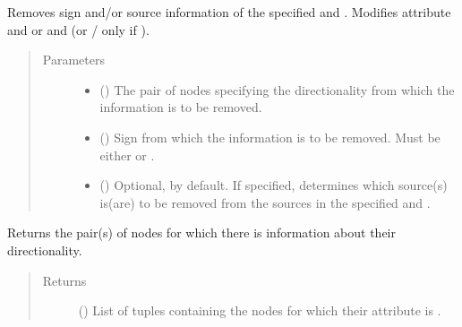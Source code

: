 \documentclass[letterpaper,10pt,english]{sphinxmanual}
\begin{document}
\begin{fulllineitems}
\begin{fulllineitems}
\label{\detokenize{main:pypath.main.Direction.unset_sign}}
Removes sign and/or source information of the specified
 and . Modifies attribute 
and  or  and
 (or
/
only if ).
\begin{quote}\begin{description}
\item[{Parameters}] \leavevmode\begin{itemize}
\item {} 
 () \textendash{} The pair of nodes specifying the directionality from which
the information is to be removed.

\item {} 
 () \textendash{} Sign from which the information is to be removed. Must be
either  or .

\item {} 
 () \textendash{} Optional,  by default. If specified, determines
which source(s) is(are) to be removed from the sources in
the specified  and .

\end{itemize}

\end{description}\end{quote}

\end{fulllineitems}


\begin{fulllineitems}
\label{\detokenize{main:pypath.main.Direction.which_dirs}}
Returns the pair(s) of nodes for which there is information
about their directionality.
\begin{quote}\begin{description}
\item[{Returns}] \leavevmode
() \textendash{} List of tuples containing the nodes for which
their attribute  is .


\end{description}
\end{quote}
\end{fulllineitems}
\end{fulllineitems}
\end{document}
